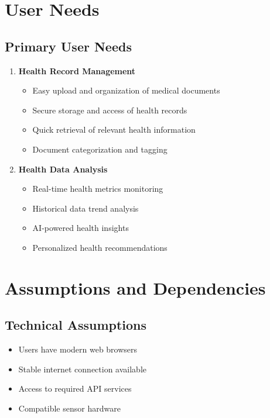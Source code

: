\section{User Needs}
\subsection{Primary User Needs}
\begin{enumerate}
    \item \textbf{Health Record Management}
    \begin{itemize}
        \item Easy upload and organization of medical documents
        \item Secure storage and access of health records
        \item Quick retrieval of relevant health information
        \item Document categorization and tagging
    \end{itemize}

    \item \textbf{Health Data Analysis}
    \begin{itemize}
        \item Real-time health metrics monitoring
        \item Historical data trend analysis
        \item AI-powered health insights
        \item Personalized health recommendations
    \end{itemize}
\end{enumerate}

\section{Assumptions and Dependencies}
\subsection{Technical Assumptions}
\begin{itemize}
    \item Users have modern web browsers
    \item Stable internet connection available
    \item Access to required API services
    \item Compatible sensor hardware
\end{itemize}

